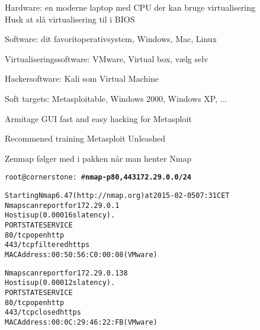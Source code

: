 \documentclass[20pt,landscape,a4paper,footrule]{foils}
\begin{document}


\begin{list2}
\item Hardware: en moderne laptop med CPU der kan bruge virtualisering\\
Husk at slå virtualisering til i BIOS
\item Software: dit favoritoperativsystem, Windows, Mac, Linux
\item Virtualiseringssoftware: VMware, Virtual box, vælg selv
\item Hackersoftware: Kali som Virtual Machine 
\item Soft targets: Metasploitable, Windows 2000, Windows XP, ...
\end{list2}




\begin{list1}
\item {}
\item Armitage GUI fast and easy hacking for Metasploit\\
\item Recommened training Metasploit Unleashed\\
\end{list1}


\centerline{Zenmap følger med i pakken når man henter Nmap }



\begin{alltt}\small
root@cornerstone:~#{\bfseries  nmap -p80,443 172.29.0.0/24}

Starting Nmap 6.47 ( http://nmap.org ) at 2015-02-05 07:31 CET
Nmap scan report for 172.29.0.1
Host is up (0.00016s latency).
PORT    STATE    SERVICE
{\color{darkgreen}80/tcp  open     http}
443/tcp filtered https
MAC Address: 00:50:56:C0:00:08 (VMware)

Nmap scan report for 172.29.0.138
Host is up (0.00012s latency).
PORT    STATE  SERVICE
{\color{darkgreen}80/tcp  open   http}
443/tcp closed https
MAC Address: 00:0C:29:46:22:FB (VMware)

\end{alltt}
\end{document}
